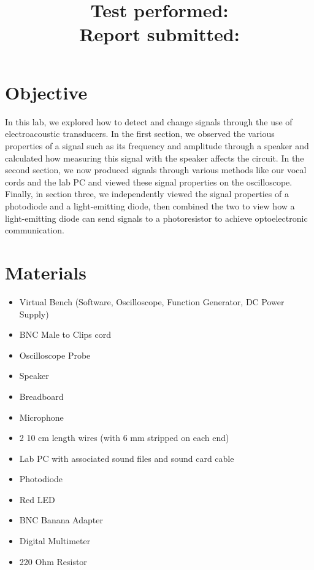 \documentclass[10pt]{article}
\title{
    \textbf{\courseTitle} \\
    \textbf{\documentTitle} \\
    \bigskip
    \textbf{\large{Test performed: \testDate}} \\
    \textbf{\large{Report submitted: \reportDate}} \\
    \bigskip
    \bigskip
}
\author{\documentAuthor}
\date{}
\begin{document}
\maketitle

\newpage

\section{Objective}

In this lab, we explored how to detect and change signals through the use of electroacoustic transducers. In the first section, we observed the various properties of a signal such as its frequency and amplitude through a speaker and calculated how measuring this signal with the speaker affects the circuit. In the second section, we now produced signals through various methods like our vocal cords and the lab PC and viewed these signal properties on the oscilloscope. Finally, in section three, we independently viewed the signal properties of a photodiode and a light-emitting diode, then combined the two to view how a light-emitting diode can send signals to a photoresistor to achieve optoelectronic communication. 

\medskip





\section{Materials}

\begin{itemize}
	\item Virtual Bench (Software, Oscilloscope, Function Generator, DC Power Supply)
	\item BNC Male to Clips cord
	\item Oscilloscope Probe
	\item Speaker
	\item Breadboard
	\item Microphone
	\item 2 10 cm length wires (with 6 mm stripped on each end)
	\item Lab PC with associated sound files and sound card cable
	\item Photodiode 
	\item Red LED
	\item BNC Banana Adapter
	\item Digital Multimeter
	\item 220 Ohm Resistor
\end{itemize}
\end{document}
